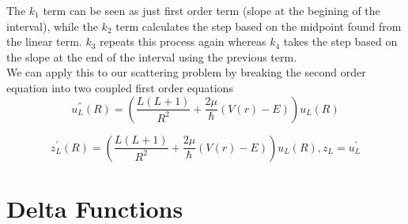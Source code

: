 \documentclass[11pt]{article} %
\begin{document}
The $k_1$ term can be seen as just first order term (slope at the begining of the interval), while the $k_2$ term calculates the step based on the midpoint found from the linear term.  
$k_3$ repeats this process again whereas $k_4$ takes the step based on the slope at the end of the interval using the previous term. \\
We can apply this to our scattering problem by breaking the second order equation into two coupled first order equations
\begin{equation}
u_{L}^{''}(R)=\left(\frac{L(L+1)}{R^2}+\frac{2\mu}{\hbar}(V(r)-E)\right)u_{L}(R)
\end{equation}

\begin{equation}
z_{L}^{'}(R)=\left(\frac{L(L+1)}{R^2}+\frac{2\mu}{\hbar}(V(r)-E)\right)u_{L}(R),
z_{L}=u_{L}^{'}
\end{equation}

\section{Delta Functions}

\begin{figure}[htbp]
\centering
\begin{floatrow}
\quad
{}
\quad
{}
\end{floatrow}
\end{figure}
\end{document}
